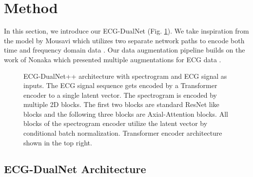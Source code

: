\section{Method} \label{sec:method}

In this section, we introduce our ECG-DualNet (Fig. \ref{fig:ecg_dual_net}). We take inspiration from the model by Mousavi \etal which utilizes two separate network paths to encode both time and frequency domain data \cite{Mousavi2019}. Our data augmentation pipeline builds on the work of Nonaka \etal which presented multiple augmentations for ECG data \cite{Nonaka2020}.


\begin{figure}[!ht]
    \centering
    \scalebox{0.5}{}
    \caption{ECG-DualNet++ architecture with spectrogram and ECG signal as inputs. The ECG signal sequence gets encoded by a Transformer encoder to a single latent vector. The spectrogram is encoded by multiple 2D blocks. The first two blocks are standard ResNet like blocks and the following three blocks are Axial-Attention blocks. All blocks of the spectrogram encoder utilize the latent vector by conditional batch normalization. Transformer encoder \cite{Vaswani2017} architecture shown in the top right.}
    \label{fig:ecg_dual_net}
\end{figure}

\subsection{ECG-DualNet Architecture} \label{subsec:ecg_dualnet}

